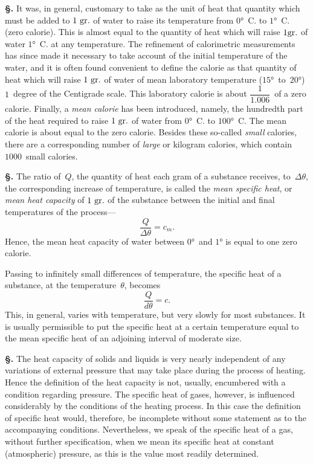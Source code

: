 \documentclass[12pt]{book}[2005/09/16]
\newcommand{\Section}[1]{
  \medskip\par\textbf{§\;#1}
  \label{section:#1}
}
\newcommand{\PageSep}[1]{\ignorespaces}
\newcommand{\Unit}[1]{\text{\upshape #1}}
\begin{document}
\Section{45.} It was, in general, customary to take as the unit of
heat that quantity which must be added to $1~\Unit{gr.}$ of
water to raise its temperature from $0°$~C. to $1°$~C. (zero
\PageSep{33}
calorie). This is almost equal to the quantity of heat which
%
%
%
%
%
%
%
will raise $1\Unit{gr.}$ of water $1°$~C. at any temperature. The
refinement of calorimetric measurements has since made it
necessary to take account of the initial temperature of the
water, and it is often found convenient to define the calorie
as that quantity of heat which will raise $1~\Unit{gr.}$ of water
of mean laboratory temperature ($15°$~to~$20°$) $1$~degree of
the Centigrade scale. This laboratory calorie is about
$\dfrac{1}{1.006}$~of a zero calorie. Finally, a \emph{mean calorie} has been
%
introduced, namely, the hundredth part of the heat required
to raise $1~\Unit{gr.}$ of water from $0°$~C. to $100°$~C\@. The mean
calorie is about equal to the zero calorie. Besides these
so-called \emph{small} calories, there are a corresponding number
of \emph{large} or kilogram calories, which contain $1000$~small
calories.

\Section{46.} The ratio of~$Q$, the quantity of heat each gram
of a substance receives, to~$\Delta\theta$, the corresponding increase of
temperature, is called the \emph{mean specific heat}, or \emph{mean heat
%
capacity} of $1~\Unit{gr.}$ of the substance between the initial and
final temperatures of the process---
\[
\frac{Q}{\Delta\theta} = c_{m}.
\]
Hence, the mean heat capacity of water between $0°$~and
$1°$ is equal to one zero calorie.

Passing to infinitely small differences of temperature,
the specific heat of a substance, at the temperature~$\theta$,
becomes
\[
\frac{Q}{d\theta} = c.
\]
This, in general, varies with temperature, but very slowly
for most substances. It is usually permissible to put the
specific heat at a certain temperature equal to the mean
specific heat of an adjoining interval of moderate size.

\Section{47.} The heat capacity of solids and liquids is very
\PageSep{34}
nearly independent of any variations of external pressure
that may take place during the process of heating. Hence
the definition of the heat capacity is not, usually, encumbered
%
%
%
%
with a condition regarding pressure. The specific heat of
gases, however, is influenced considerably by the conditions
of the heating process. In this case the definition of
specific heat would, therefore, be incomplete without some
statement as to the accompanying conditions. Nevertheless,
we speak of the specific heat of a gas, without further
specification, when we mean its specific heat at constant
(atmospheric) pressure, as this is the value most readily
determined.
\end{document}
